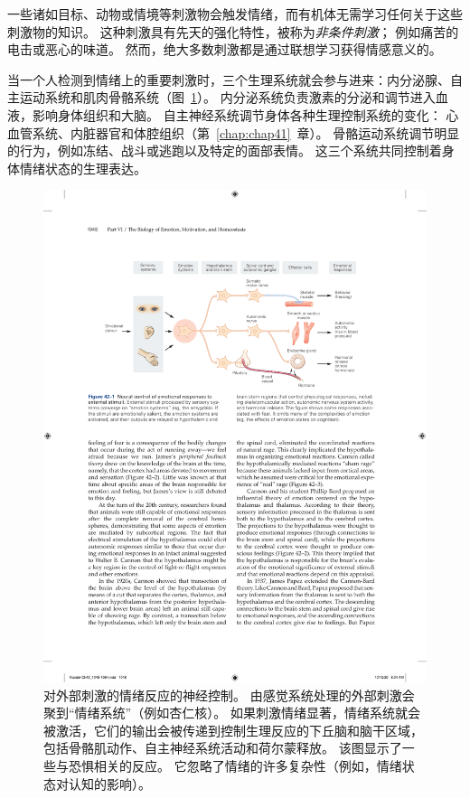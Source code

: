 一些诸如目标、动物或情境等刺激物会触发情绪，而有机体无需学习任何关于这些刺激物的知识。
这种刺激具有先天的强化特性，被称为\textit{非条件刺激}；
例如痛苦的电击或恶心的味道。
然而，绝大多数刺激都是通过联想学习获得情感意义的。


当一个人检测到情绪上的重要刺激时，三个生理系统就会参与进来：内分泌腺、自主运动系统和肌肉骨骼系统（图~\ref{fig:42_1}）。
内分泌系统负责激素的分泌和调节进入血液，影响身体组织和大脑。
自主神经系统调节身体各种生理控制系统的变化：
心血管系统、内脏器官和体腔组织（第~\ref{chap:chap41}~章）。
骨骼运动系统调节明显的行为，例如冻结、战斗或逃跑以及特定的面部表情。
这三个系统共同控制着身体情绪状态的生理表达。


\begin{figure}[htbp]
	\centering
	\includegraphics[width=1.0\linewidth]{chap42/fig_42_1}
	\caption{对外部刺激的情绪反应的神经控制。
		由感觉系统处理的外部刺激会聚到“情绪系统”（例如杏仁核）。
		如果刺激情绪显著，情绪系统就会被激活，它们的输出会被传递到控制生理反应的下丘脑和脑干区域，包括骨骼肌动作、自主神经系统活动和荷尔蒙释放。
		该图显示了一些与恐惧相关的反应。
		它忽略了情绪的许多复杂性（例如，情绪状态对认知的影响）。}
	\label{fig:42_1}
\end{figure}


